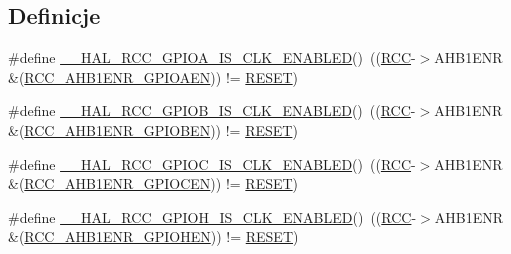 \subsection*{Definicje}
\begin{DoxyCompactItemize}
\item 
\#define \hyperlink{group___r_c_c___a_h_b1___peripheral___clock___enable___disable___status_gad1edbd9407c814110f04c1a609a214e4}{\+\_\+\+\_\+\+H\+A\+L\+\_\+\+R\+C\+C\+\_\+\+G\+P\+I\+O\+A\+\_\+\+I\+S\+\_\+\+C\+L\+K\+\_\+\+E\+N\+A\+B\+L\+ED}()~((\hyperlink{group___peripheral__declaration_ga74944438a086975793d26ae48d5882d4}{R\+CC}-\/$>$A\+H\+B1\+E\+NR \&(\hyperlink{group___peripheral___registers___bits___definition_ga6ff46fb3b30fc6792e4fd18fcb0941b5}{R\+C\+C\+\_\+\+A\+H\+B1\+E\+N\+R\+\_\+\+G\+P\+I\+O\+A\+EN})) != \hyperlink{group___exported__types_gga89136caac2e14c55151f527ac02daaffa589b7d94a3d91d145720e2fed0eb3a05}{R\+E\+S\+ET})
\item 
\#define \hyperlink{group___r_c_c___a_h_b1___peripheral___clock___enable___disable___status_ga2fc8f9dc5f5b64c14c325c45ee301b4f}{\+\_\+\+\_\+\+H\+A\+L\+\_\+\+R\+C\+C\+\_\+\+G\+P\+I\+O\+B\+\_\+\+I\+S\+\_\+\+C\+L\+K\+\_\+\+E\+N\+A\+B\+L\+ED}()~((\hyperlink{group___peripheral__declaration_ga74944438a086975793d26ae48d5882d4}{R\+CC}-\/$>$A\+H\+B1\+E\+NR \&(\hyperlink{group___peripheral___registers___bits___definition_gad7f408f92e7fd49b0957b8cb4ff31ca5}{R\+C\+C\+\_\+\+A\+H\+B1\+E\+N\+R\+\_\+\+G\+P\+I\+O\+B\+EN})) != \hyperlink{group___exported__types_gga89136caac2e14c55151f527ac02daaffa589b7d94a3d91d145720e2fed0eb3a05}{R\+E\+S\+ET})
\item 
\#define \hyperlink{group___r_c_c___a_h_b1___peripheral___clock___enable___disable___status_ga528029c120a0154dfd7cfd6159e8debe}{\+\_\+\+\_\+\+H\+A\+L\+\_\+\+R\+C\+C\+\_\+\+G\+P\+I\+O\+C\+\_\+\+I\+S\+\_\+\+C\+L\+K\+\_\+\+E\+N\+A\+B\+L\+ED}()~((\hyperlink{group___peripheral__declaration_ga74944438a086975793d26ae48d5882d4}{R\+CC}-\/$>$A\+H\+B1\+E\+NR \&(\hyperlink{group___peripheral___registers___bits___definition_gae8a8b42e33aef2a7bc2d41ad9d231733}{R\+C\+C\+\_\+\+A\+H\+B1\+E\+N\+R\+\_\+\+G\+P\+I\+O\+C\+EN})) != \hyperlink{group___exported__types_gga89136caac2e14c55151f527ac02daaffa589b7d94a3d91d145720e2fed0eb3a05}{R\+E\+S\+ET})
\item 
\#define \hyperlink{group___r_c_c___a_h_b1___peripheral___clock___enable___disable___status_ga8e182ed43301e2586bc198a729b50436}{\+\_\+\+\_\+\+H\+A\+L\+\_\+\+R\+C\+C\+\_\+\+G\+P\+I\+O\+H\+\_\+\+I\+S\+\_\+\+C\+L\+K\+\_\+\+E\+N\+A\+B\+L\+ED}()~((\hyperlink{group___peripheral__declaration_ga74944438a086975793d26ae48d5882d4}{R\+CC}-\/$>$A\+H\+B1\+E\+NR \&(\hyperlink{group___peripheral___registers___bits___definition_gadb16afc550121895822ebb22108196b6}{R\+C\+C\+\_\+\+A\+H\+B1\+E\+N\+R\+\_\+\+G\+P\+I\+O\+H\+EN})) != \hyperlink{group___exported__types_gga89136caac2e14c55151f527ac02daaffa589b7d94a3d91d145720e2fed0eb3a05}{R\+E\+S\+ET})

\end{DoxyCompactItemize}
